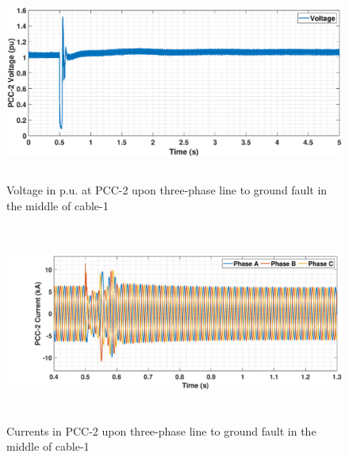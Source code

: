 \begin{figure}[H]
\captionsetup{justification=centering}
    \includegraphics[height = 6.5cm,width = \textwidth]{Diagrams/Chapter_5/VACP_WT2_3phaseSC.eps}
    \caption{Voltage in p.u. at PCC-2 upon three-phase line to ground fault in the middle of cable-1}
    \label{VACP_WT234_3phaseSC}
\end{figure}


\begin{figure}[H]
\captionsetup{justification=centering}
    \includegraphics[height = 6.5cm,width = \textwidth]{Diagrams/Chapter_5/IABC_WT2_3phaseSC.eps}
    \caption{Currents in PCC-2 upon three-phase line to ground fault in the middle of cable-1}
    \label{IABC_WT2_3phaseSC}
\end{figure}

